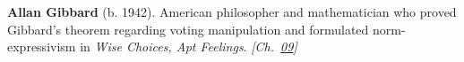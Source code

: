 \textbf{Allan Gibbard} (b. 1942). American philosopher and mathematician who proved Gibbard's theorem regarding voting manipulation and formulated norm-expressivism in \emph{Wise Choices, Apt Feelings}. \emph{[Ch.~\hyperref[ch:arrowtheoremtopology]{09}]}

